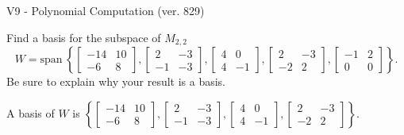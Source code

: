 \begin{exercise}
  \begin{exerciseTitle}V9 - Polynomial Computation (ver. 829)\end{exerciseTitle}
  \begin{exerciseStatement}
    Find a basis for the subspace of \(M_{2,2}\) 
\[W=\mathrm{span}\ \left\{\left[\begin{array}{cc}
-14 & 10 \\
-6 & 8
\end{array}\right] , \left[\begin{array}{cc}
2 & -3 \\
-1 & -3
\end{array}\right] , \left[\begin{array}{cc}
4 & 0 \\
4 & -1
\end{array}\right] , \left[\begin{array}{cc}
2 & -3 \\
-2 & 2
\end{array}\right] , \left[\begin{array}{cc}
-1 & 2 \\
0 & 0
\end{array}\right]\right\}.\]
 Be sure to explain why your result is a basis.


  \end{exerciseStatement}
  \begin{exerciseAnswer}
   A basis of \(W\) is  \(\left\{\left[\begin{array}{cc}
-14 & 10 \\
-6 & 8
\end{array}\right] , \left[\begin{array}{cc}
2 & -3 \\
-1 & -3
\end{array}\right] , \left[\begin{array}{cc}
4 & 0 \\
4 & -1
\end{array}\right] , \left[\begin{array}{cc}
2 & -3 \\
-2 & 2
\end{array}\right]\right\}\).
  


  \end{exerciseAnswer}
\end{exercise}